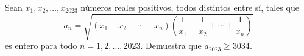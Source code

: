 Sean $x_1, x_2, \dots , x_{2023}$ números reales positivos, todos distintos entre sí, tales que
\[a_n = \sqrt{\left(x_1+x_2+\cdots+x_n\right)\left(\frac{1}{x_1}+\frac{1}{x_2}+\cdots+\frac{1}{x_n}\right)}\]
es entero para todo $n = 1, 2, \dots , 2023$. Demuestra que $a_{2023} \geq 3034$.